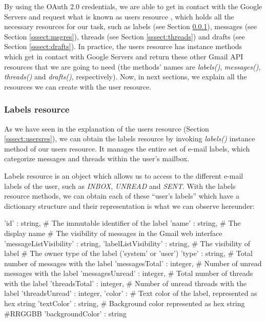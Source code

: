By using the OAuth 2.0 credentials, we are able to get in contact with the Google Servers and request what is known as users resource \citep[/v1/reference/users]{gmailAPI}, which holds all the necessary resources for our task, such as labels (see Section \ref{sssect:labres}), messages (see Section \ref{sssect:msgres}), threads (see Section \ref{sssect:threads}) and drafts (see Section \ref{sssect:drafts}). In practice, the users resource has instance methods which get in contact with Google Servers and return these other Gmail API resources that we are going to need (the methods' names are \textit{labels()}, \textit{messages()}, \textit{threads()} and \textit{drafts()}, respectively). Now, in next sections, we explain all the resources we can create with the user resource.

\subsubsection{Labels resource}\label{sssect:labres}
As we have seen in the explanation of the users resource (Section \ref{sssect:usersres}), we can obtain the labels resource \citep[/v1/reference/users/labels]{gmailAPI} by invoking \textit{labels()} instance method of our users resource. It manages the entire set of e-mail labels, which  categorize messages and threads within the user's mailbox.

Labels resource is an object which allows us to access to the different e-mail labels of the user, such as \textit{INBOX}, \textit{UNREAD} and \textit{SENT}. With the labels resource methods, we can obtain each of these ``user's labels'' which have a dictionary structure and their representation is what we can observe hereunder:

\begin{python}
	{
		'id' : string, # The immutable identifier of the label
		'name' : string, # The display name
		# The visibility of messages in the Gmail web interface
		'messageListVisibility' : string,
		'labelListVisibility' : string, # The visibility of label
		# The owner type of the label ('system' or 'user')
		'type' : string,
		# Total number of messages with the label
		'messagesTotal' : integer,
		# Number of unread messages with the label
		'messagesUnread' : integer,
		# Total number of threads with the label
		'threadsTotal' : integer,
		# Number of unread threads with the label
		'threadsUnread' : integer,
		'color' : {
			# Text color of the label, represented as hex string
			'textColor' : string,
			# Background color represented as hex string #RRGGBB
			'backgroundColor' : string 
		}
	}
\end{python}

